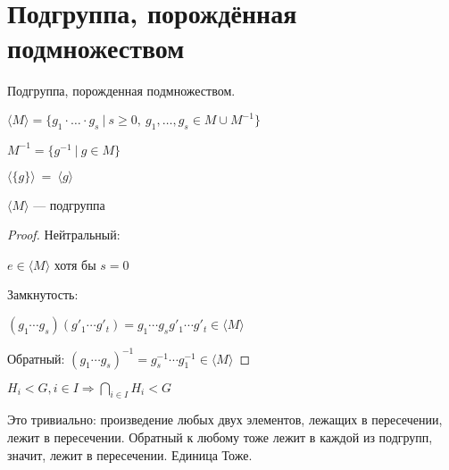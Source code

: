 \section{Подгруппа, порождённая подмножеством}
\begin{conj}
    Подгруппа, порожденная подмножеством.
  
    $\langle M \rangle = \{ g_1 \cdot \ldots \cdot g_s\ |\ s \geq 0,\ g_1, \ldots, g_s \in M \cup M^{-1} \}$
  
    $M^{-1} = \{ g^{-1}\ |\ g\in M \}$
    
\end{conj}
  
\notice $\langle \{g\} \rangle \ =\ \langle g \rangle$
\begin{theorem-non}
$\langle M \rangle$ --- подгруппа
\begin{proof}
    Нейтральный:

    $e\in \langle M \rangle$ хотя бы $s = 0$

    Замкнутость: 

    $(g_1 \cdots g_s)(g'_1 \cdots g'_t) = g_1 \cdots g_s g'_1 \cdots g'_t \in \langle M \rangle$

    Обратный:
    $(g_1 \cdots g_s)^{-1} = g_s^{-1} \cdots g_1^{-1} \in \langle M \rangle$  
\end{proof}

\end{theorem-non}
\notice $H_i < G, i\in I \Longrightarrow \bigcap\limits_{i\in I} H_i < G$

Это тривиально: произведение любых двух элементов, лежащих в пересечении, лежит в пересечении. Обратный к любому тоже лежит в каждой из подгрупп, значит, лежит в пересечении. Единица Тоже.

